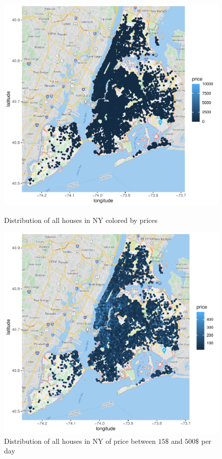 \documentclass{FR16}
\begin{document}
\begin{figure}[!htb]
   \begin{minipage}{0.48\textwidth}
     \centering
     \includegraphics[width=1\linewidth]{figures/figure2.pdf} 
     \caption{\label{fig:2}Distribution of all houses in NY colored by prices}

   \end{minipage}\hfill
   \begin{minipage}{0.48\textwidth}
     \centering
     \includegraphics[width=1\linewidth]{figures/figure3.pdf}
     \caption{\label{fig:3} Distribution of all houses in NY of price between $15\$$ and $500\$$ per day}

   \end{minipage}

\end{figure}
\end{document}
